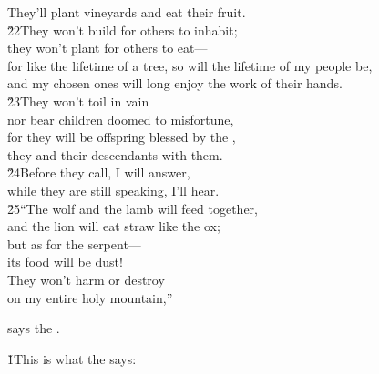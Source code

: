 \begin{poetry}
\poemll    They'll plant vineyards and eat their fruit. \\
\poeml \v{22}They won't build for others to inhabit; \\
\poemll    they won't plant for others to eat--- \\
\poeml for like the lifetime of a tree, so will the lifetime of my people be, \\
\poemll    and my chosen ones will long enjoy the work of their hands. \\
\poeml \v{23}They won't toil in vain \\
\poemll    nor bear children doomed to misfortune, \\
\poeml for they will be offspring blessed by the , \\
\poemll    they and their descendants with them. \\
\poeml \v{24}Before they call, I will answer, \\
\poemll    while they are still speaking, I'll hear. \\
\poeml \v{25}``The wolf and the lamb will feed together, \\
\poemll    and the lion will eat straw like the ox; \\
\poeml but as for the serpent--- \\
\poemll    its food will be dust! \\
\poeml They won't harm or destroy \\
\poemll    on my entire holy mountain,''
\end{poetry}

says the .

\v{1}This is what the  says:

